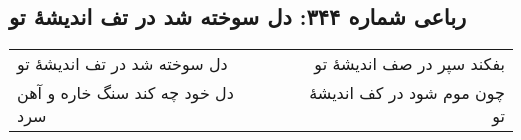 \begin{center}
\section*{رباعی شماره ۳۴۴: دل سوخته شد در تف اندیشهٔ تو}
\label{sec:sh344}
\begin{longtable}{l p{0.5cm} r}
دل سوخته شد در تف اندیشهٔ تو
&&
بفکند سپر در صف اندیشهٔ تو
\\
دل خود چه کند سنگ خاره و آهن سرد
&&
چون موم شود در کف اندیشهٔ تو
\\
\end{longtable}
\end{center}
